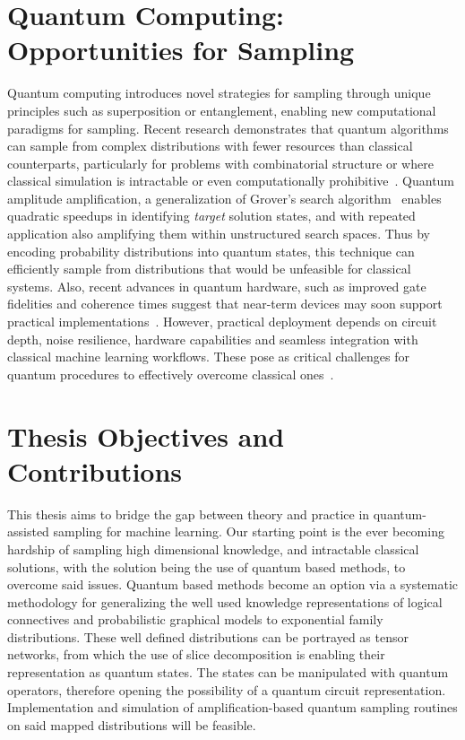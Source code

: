 \documentclass[encoding=utf8,british]{tumphthesis}
\begin{document}
    \section*{Quantum Computing: Opportunities for Sampling}
    \label{sect:Intro_Opportunities}
        Quantum computing introduces novel strategies for sampling through unique principles such as superposition or 
        entanglement, enabling new computational paradigms for sampling. Recent 
        research demonstrates that quantum algorithms can sample from complex distributions with fewer resources than 
        classical counterparts, particularly for problems with combinatorial structure or where classical simulation 
        is intractable or even computationally prohibitive~\cite{larose2024briefhistoryquantumvs}\cite{Wilson_2021}. Quantum amplitude amplification, a 
        generalization of Grover's search algorithm~\cite{Grover} enables quadratic speedups in identifying \textit{target} 
        solution states, and with repeated application also amplifying them within unstructured search spaces. Thus by encoding probability distributions into quantum 
        states, this technique can efficiently sample from distributions that would be unfeasible for classical systems.
        Also, recent advances in quantum hardware, such as improved gate fidelities and coherence times suggest that 
        near-term devices may soon support practical implementations~\cite{IQM2024}. However, practical deployment depends on 
        circuit depth, noise resilience, hardware capabilities and seamless integration with classical machine 
        learning workflows. These pose as critical challenges for quantum procedures to effectively overcome classical ones~\cite{Moody2025}\cite{SpinQ2025}.

    \section*{Thesis Objectives and Contributions}
    \label{sect:Intro_Objectives}
        This thesis aims to bridge the gap between theory and practice in quantum-assisted sampling for machine 
        learning. Our starting point is the ever becoming hardship of sampling high dimensional knowledge, and intractable
        classical solutions, with the solution being the use of quantum based methods, to overcome said issues. Quantum based methods 
        become an option via a systematic methodology for generalizing the well used knowledge representations of logical connectives and probabilistic 
        graphical models to exponential family distributions. These well defined distributions can be portrayed as tensor networks, from which the use of
        slice decomposition is enabling their representation as quantum states. The states can be manipulated with quantum operators, 
        therefore opening the possibility of a quantum circuit representation. Implementation and simulation of amplification-based quantum sampling 
        routines on said mapped distributions will be feasible.
\end{document}

